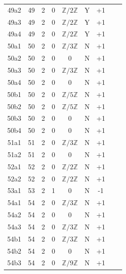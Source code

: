 \begin{longtable}{ccccccccc}
49a2 & 49 & 2 & 0 & $\mathbb{Z}/2\mathbb{Z}$ & Y & +1 &  &  \\
49a3 & 49 & 2 & 0 & $\mathbb{Z}/2\mathbb{Z}$ & Y & +1 &  &  \\
49a4 & 49 & 2 & 0 & $\mathbb{Z}/2\mathbb{Z}$ & Y & +1 &  &  \\
50a1 & 50 & 2 & 0 & $\mathbb{Z}/3\mathbb{Z}$ & N & +1 &  &  \\
50a2 & 50 & 2 & 0 & 0 & N & +1 &  &  \\
50a3 & 50 & 2 & 0 & $\mathbb{Z}/3\mathbb{Z}$ & N & +1 &  &  \\
50a4 & 50 & 2 & 0 & 0 & N & +1 &  &  \\
50b1 & 50 & 2 & 0 & $\mathbb{Z}/5\mathbb{Z}$ & N & +1 &  &  \\
50b2 & 50 & 2 & 0 & $\mathbb{Z}/5\mathbb{Z}$ & N & +1 &  &  \\
50b3 & 50 & 2 & 0 & 0 & N & +1 &  &  \\
50b4 & 50 & 2 & 0 & 0 & N & +1 &  &  \\
51a1 & 51 & 2 & 0 & $\mathbb{Z}/3\mathbb{Z}$ & N & +1 &  &  \\
51a2 & 51 & 2 & 0 & 0 & N & +1 &  &  \\
52a1 & 52 & 2 & 0 & $\mathbb{Z}/2\mathbb{Z}$ & N & +1 &  &  \\
52a2 & 52 & 2 & 0 & $\mathbb{Z}/2\mathbb{Z}$ & N & +1 &  &  \\
53a1 & 53 & 2 & 1 & 0 & N & -1 &  &  \\
54a1 & 54 & 2 & 0 & $\mathbb{Z}/3\mathbb{Z}$ & N & +1 &  &  \\
54a2 & 54 & 2 & 0 & 0 & N & +1 &  &  \\
54a3 & 54 & 2 & 0 & $\mathbb{Z}/3\mathbb{Z}$ & N & +1 &  &  \\
54b1 & 54 & 2 & 0 & $\mathbb{Z}/3\mathbb{Z}$ & N & +1 &  &  \\
54b2 & 54 & 2 & 0 & 0 & N & +1 &  &  \\
54b3 & 54 & 2 & 0 & $\mathbb{Z}/9\mathbb{Z}$ & N & +1 &  &  \\
\end{longtable}